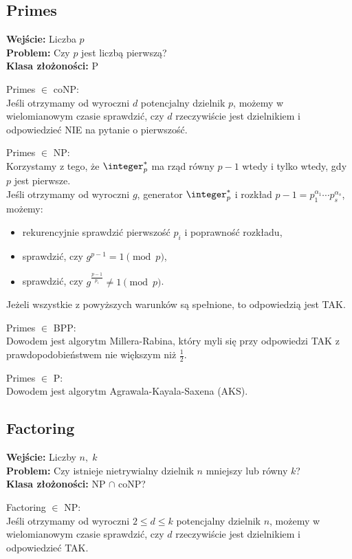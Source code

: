 \subsection{Primes}
\textbf{Wejście:} Liczba \( p \) \\
\textbf{Problem:} Czy \( p \) jest liczbą pierwszą? \\
\textbf{Klasa złożoności:} P

Primes \( \in \) coNP: \\
Jeśli otrzymamy od wyroczni \( d \) potencjalny dzielnik \( p \), możemy w wielomianowym czasie sprawdzić, czy \( d \) rzeczywiście jest dzielnikiem i odpowiedzieć NIE na pytanie o pierwszość.

Primes \( \in \) NP: \\
Korzystamy z tego, że \( \integer_p^* \) ma rząd równy \( p-1 \) wtedy i tylko wtedy, gdy \( p \) jest pierwsze. \\
Jeśli otrzymamy od wyroczni \( g \), generator \( \integer_p^* \) i rozkład \( p-1 = p_1^{\alpha_1} \cdots p_s^{\alpha_s} \), możemy:
\begin{itemize}
	\item rekurencyjnie sprawdzić pierwszość \( p_i \) i poprawność rozkładu,
	\item sprawdzić, czy \( g^{p-1} = 1 \pmod{p} \),
	\item sprawdzić, czy \( g^{\frac{p-1}{p_i}} \neq 1 \pmod{p} \).
\end{itemize}
Jeżeli wszystkie z powyższych warunków są spełnione, to odpowiedzią jest TAK.

Primes \( \in \) BPP: \\
Dowodem jest algorytm Millera-Rabina, który myli się przy odpowiedzi TAK z prawdopodobieństwem nie większym niż \( \frac{1}{2} \).

Primes \( \in \) P: \\
Dowodem jest algorytm Agrawala-Kayala-Saxena (AKS).

\subsection{Factoring}
\textbf{Wejście:} Liczby \( n,\; k \) \\
\textbf{Problem:} Czy istnieje nietrywialny dzielnik \( n \) mniejszy lub równy \( k \)? \\
\textbf{Klasa złożoności:} NP \( \cap \) coNP?

Factoring \( \in \) NP: \\
Jeśli otrzymamy od wyroczni \( 2 \leq d \leq k \) potencjalny dzielnik \( n \), możemy w wielomianowym czasie sprawdzić, czy \( d \) rzeczywiście jest dzielnikiem i odpowiedzieć TAK.

